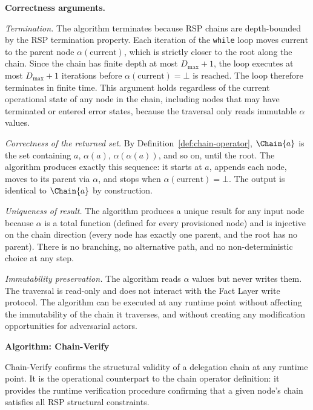 \bigskip
\noindent\textbf{Correctness arguments.}

\textit{Termination.} The algorithm terminates because RSP chains are depth-bounded by the RSP termination property. Each iteration of the \texttt{while} loop moves $\text{current}$ to the parent node $\alpha(\text{current})$, which is strictly closer to the root along the chain. Since the chain has finite depth at most $D_{\max} + 1$, the loop executes at most $D_{\max} + 1$ iterations before $\alpha(\text{current}) = \bot$ is reached. The loop therefore terminates in finite time. This argument holds regardless of the current operational state of any node in the chain, including nodes that may have terminated or entered error states, because the traversal only reads immutable $\alpha$ values.

\textit{Correctness of the returned set.} By Definition~\ref{def:chain-operator}, $\Chain{a}$ is the set containing $a$, $\alpha(a)$, $\alpha(\alpha(a))$, and so on, until the root. The algorithm produces exactly this sequence: it starts at $a$, appends each node, moves to its parent via $\alpha$, and stops when $\alpha(\text{current}) = \bot$. The output is identical to $\Chain{a}$ by construction.

\textit{Uniqueness of result.} The algorithm produces a unique result for any input node because $\alpha$ is a total function (defined for every provisioned node) and is injective on the chain direction (every node has exactly one parent, and the root has no parent). There is no branching, no alternative path, and no non-deterministic choice at any step.

\textit{Immutability preservation.} The algorithm reads $\alpha$ values but never writes them. The traversal is read-only and does not interact with the Fact Layer write protocol. The algorithm can be executed at any runtime point without affecting the immutability of the chain it traverses, and without creating any modification opportunities for adversarial actors.

\bigskip
\noindent\textbf{Algorithm: Chain-Verify}

Chain-Verify confirms the structural validity of a delegation chain at any runtime point. It is the operational counterpart to the chain operator definition: it provides the runtime verification procedure confirming that a given node's chain satisfies all RSP structural constraints.

